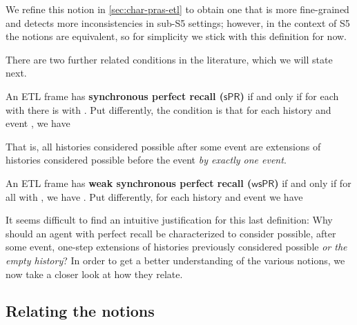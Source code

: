 \documentclass{article}
\newcommand{\PRs}{\ensuremath{\mathsf{sPR}}\xspace}
\newcommand{\PRsprime}{\ensuremath{\mathsf{wsPR}}\xspace}
\def\dfn{\textbf}
\newcommand{\tiff}{if and only if\xspace}
\newcounter{#1}
\begin{document}
We refine this notion in \cref{sec:char-pras-etl}
to obtain one that is more fine-grained and detects more inconsistencies in sub-S5 settings;
however, in the context of S5 the notions are equivalent,
so for simplicity we stick with this definition for now.

\medskip

There are two further related conditions in the literature,
which we will state next.

\begin{definition} An ETL frame has \dfn{synchronous perfect recall (\PRs)} \tiff
  for each  with  there is  with .
  Put differently,
  the condition is that for each history  and event , we have
  
\end{definition}
That is, all histories considered possible after some event
are extensions of histories considered possible before the event \emph{by exactly one event}.

\begin{definition}
  An ETL frame has \dfn{weak synchronous perfect recall (\PRsprime)} \tiff
  for all  with , we have .
  Put differently, 
  for each history  and event  we have
  
\end{definition}

It seems difficult to find an intuitive justification for this last definition:
Why should an agent with perfect recall be characterized to consider possible,
after some event, one-step extensions of histories previously considered possible
\emph{or the empty history}?
In order to get a better understanding of the various notions,
we now take a closer look at how they relate.

\subsection{Relating the notions}
\label{sec:relating-notions}
\end{document}
